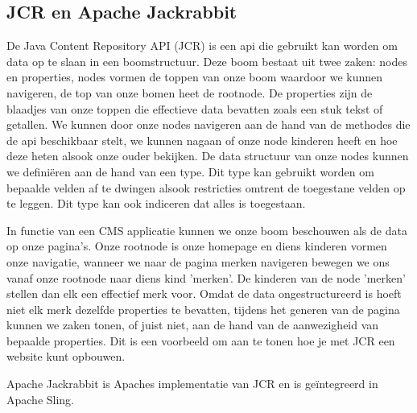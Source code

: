 \documentclass{article}
\begin{document}
	\subsection{JCR en Apache Jackrabbit}
	De Java Content Repository API (JCR) is een api die gebruikt kan worden om data op te slaan in een boomstructuur. Deze boom bestaat uit twee zaken: nodes en properties, nodes vormen de toppen van onze boom waardoor we kunnen navigeren, de top van onze bomen heet de rootnode. De properties zijn de blaadjes van onze toppen die effectieve data bevatten zoals een stuk tekst of getallen. We kunnen door onze nodes navigeren aan de hand van de methodes die de api beschikbaar stelt, we kunnen nagaan of onze node kinderen heeft en hoe deze heten alsook onze ouder bekijken. De data structuur van onze nodes kunnen we definiëren aan de hand van een type. Dit type kan gebruikt worden om bepaalde velden af te dwingen alsook restricties omtrent de toegestane velden op te leggen. Dit type kan ook indiceren dat alles is toegestaan. 
	\par
	In functie van een CMS applicatie kunnen we onze boom beschouwen als de data op onze pagina's. Onze rootnode is onze homepage en diens kinderen vormen onze navigatie, wanneer we naar de pagina merken navigeren bewegen we ons vanaf onze rootnode naar diens kind 'merken'. De kinderen van de node 'merken' stellen dan elk een effectief merk voor. Omdat de data ongestructureerd is hoeft niet elk merk dezelfde properties te bevatten, tijdens het generen van de pagina kunnen we zaken tonen, of juist niet, aan de hand van de aanwezigheid van bepaalde properties. Dit is een voorbeeld om aan te tonen hoe je met JCR een website kunt opbouwen.
	\par
	Apache Jackrabbit is Apaches implementatie van JCR en is geïntegreerd in Apache Sling.
\end{document}

